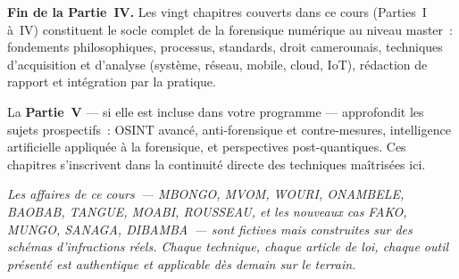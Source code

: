 \bigskip

\begin{boxinfo}
\textbf{Fin de la Partie~IV.} Les vingt chapitres couverts dans
ce cours (Parties~I à~IV) constituent le socle complet de la
forensique numérique au niveau master~: fondements philosophiques,
processus, standards, droit camerounais, techniques d'acquisition
et d'analyse (système, réseau, mobile, cloud, IoT), rédaction
de rapport et intégration par la pratique.

La \textbf{Partie~V} --- si elle est incluse dans votre programme
--- approfondit les sujets prospectifs~: OSINT avancé,
anti-forensique et contre-mesures, intelligence artificielle
appliquée à la forensique, et perspectives post-quantiques.
Ces chapitres s'inscrivent dans la continuité directe des
techniques maîtrisées ici.

\textit{Les affaires de ce cours~--- MBONGO, MVOM, WOURI,
ONAMBELE, BAOBAB, TANGUE, MOABI, ROUSSEAU, et les nouveaux
cas FAKO, MUNGO, SANAGA, DIBAMBA~--- sont fictives mais
construites sur des schémas d'infractions réels. Chaque
technique, chaque article de loi, chaque outil présenté est
authentique et applicable dès demain sur le terrain.}
\end{boxinfo}
